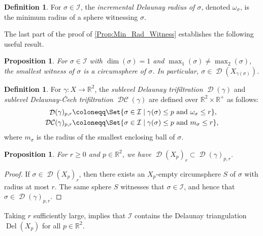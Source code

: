 \documentclass[11pt]{amsart}
\newcommand{\R}{\mathbb{R}} %
\DeclareMathOperator{\DelT}{Del}
\DeclareMathOperator{\Del}{\mathcal{D}}
\DeclareMathOperator{\DelCech}{\mathcal{DC}}
\newcommand{\deff}{\emph}
\newcommand{\Incr}[0]{\mathcal{I}}
\theoremstyle{plain}
\newtheorem{proposition}[theorem]{Proposition}
\theoremstyle{definition}
\newtheorem{definition}[theorem]{Definition}
\theoremstyle{remark}
\begin{document}
%
\begin{definition}
For $\sigma\in \Incr$, the \emph{incremental Delaunay radius of $\sigma$},  denoted $\omega_\sigma$, is the minimum radius of a sphere witnessing $\sigma$. 
 \end{definition}
%
The last part of the proof of \cref{Prop:Min_Rad_Witness} establishes the following useful result.
%
\begin{proposition}\label{Prop:Empty_Tau_Delaunay}
For $\sigma\in \Incr$ with $\dim(\sigma)=1$ and $\max_1(\sigma)\ne \max_2(\sigma)$, the smallest witness of $\sigma$ is a circumsphere of $\sigma$.  In particular, $\sigma\in \Del(X_{\gamma(\sigma)})$.  
\end{proposition}
%
%
\begin{definition}
For $\gamma: X\to \R^2$, the \deff{sublevel Delaunay trifiltration} $\Del(\gamma)$ and \deff{sublevel Delaunay-\v{C}ech trifiltration} $\DelCech(\gamma)$ are defined over $\R^{2}\times\R^+$ as follows:
\begin{align*}
    \Del(\gamma)_{p, r} & \coloneqq \Set{\sigma\in\Incr \mid  \gamma(\sigma)\leq p\text{ and }  \omega_\sigma \leq r}, \\
    \DelCech(\gamma)_{p, r} & \coloneqq \Set{\sigma\in\Incr  \mid  \gamma(\sigma)\leq p\text{ and }  m_\sigma \leq r },
\end{align*}
where $m_\sigma$ is the radius of the smallest enclosing ball of $\sigma$.
\end{definition}
%
\begin{proposition}\label{prop:contains3}
For $r \geq 0$ and $p\in \R^2$, we have $\Del(X_p)_r\subset \Del(\gamma)_{p, r}$.
\end{proposition}
\begin{proof}
If $\sigma\in \Del(X_p)_r$, then there exists
an $X_p$-empty circumsphere $S$ of $\sigma$ with radius at most $r$.
The same sphere $S$ witnesses that $\sigma\in \Incr$, and hence that $\sigma\in \Del(\gamma)_{p,r}$. 
\end{proof}
%
%
Taking $r$ sufficiently large,  implies that $\Incr$ contains the Delaunay triangulation $\DelT(X_p)$ for all $p\in \R^2$.
%
\end{document}
